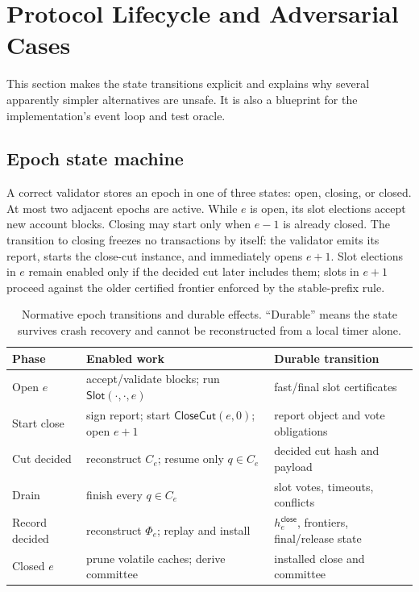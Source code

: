 \documentclass[sigplan,review,anonymous]{acmart}
\newcommand{\Slot}{\mathsf{Slot}}
\newcommand{\Cut}{\mathsf{CloseCut}}
\newcommand{\frontier}{\Phi}
\newcommand{\closehash}{h^{\mathsf{close}}}
\begin{document}
\section{Protocol Lifecycle and Adversarial Cases}
\label{sec:lifecycle}

This section makes the state transitions explicit and explains why several apparently simpler alternatives are unsafe.  It is also a blueprint for the implementation's event loop and test oracle.

\subsection{Epoch state machine}

A correct validator stores an epoch in one of three states: open, closing, or closed.  At most two adjacent epochs are active.  While $e$ is open, its slot elections accept new account blocks.  Closing may start only when $e-1$ is already closed.  The transition to closing freezes no transactions by itself: the validator emits its report, starts the close-cut instance, and immediately opens $e+1$.  Slot elections in $e$ remain enabled only if the decided cut later includes them; slots in $e+1$ proceed against the older certified frontier enforced by the stable-prefix rule.

\begin{table}[t]
\caption{Normative epoch transitions and durable effects.  ``Durable'' means the state survives crash recovery and cannot be reconstructed from a local timer alone.}
\label{tab:lifecycle}
\centering
\small
\begin{tabularx}{\columnwidth}{@{}lXX@{}}
\toprule
Phase & Enabled work & Durable transition \\
\midrule
Open $e$ & accept/validate blocks; run $\Slot(\cdot,\cdot,e)$ & fast/final slot certificates \\
Start close & sign report; start $\Cut(e,0)$; open $e+1$ & report object and vote obligations \\
Cut decided & reconstruct $C_e$; resume only $q\in C_e$ & decided cut hash and payload \\
Drain & finish every $q\in C_e$ & slot votes, timeouts, conflicts \\
Record decided & reconstruct $\frontier_e$; replay and install & $\closehash_e$, frontiers, final/release state \\
Closed $e$ & prune volatile caches; derive committee & installed close and committee \\
\bottomrule
\end{tabularx}
\end{table}
\end{document}
